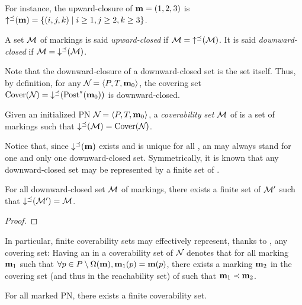 For instance, the upward-closure of $\mathbf{m} = (1, 2, 3)$ is $\operatorname{\uparrow^\preceq}(\mathbf{m}) = \left\{(i, j, k) \mid i \geq 1, j \geq 2, k \geq 3\right\}$.

\begin{defi}
  A set $\mathcal{M}$ of markings is said \emph{upward-closed} if $\mathcal{M} = \operatorname{\uparrow^\preceq}(\mathcal{M})$.
  It is said \emph{downward-closed} if $\mathcal{M} = \operatorname{\downarrow^\preceq}(\mathcal{M})$.
\end{defi}

Note that the downward-closure of a downward-closed set is the set itself.
Thus, by definition, for any $\defPN$, the covering set $\operatorname{Cover}(\mathcal{N}_{}) = \operatorname{\downarrow^\preceq}(\operatorname{Post}^*_{{}}(\mathbf{m}_0))$ is downward-closed.

\begin{defi}
  Given an initialized \ac{PN} $\defPN$, a \emph{coverability set} $\mathcal{M}$ of \namePN is a set of markings such that $\operatorname{\downarrow^\preceq}(\mathcal{M}) = \operatorname{Cover}(\mathcal{N}_{})$.
\end{defi}

Notice that, since $\operatorname{\downarrow^\preceq}(\mathbf{m})$ exists and is unique for all \omark \mar, an \omark may always stand for one and only one downward-closed set.
Symmetrically, it is known that any downward-closed set may be represented by a finite set of \omarks \cite{Abdulla96,Geeraerts06}.

\begin{lemm}
  \label{theo:repr-downc-sets}
  For all downward-closed set $\mathcal{M}$ of markings, there exists a finite set of \omarks $\mathcal{M}'$ such that $\operatorname{\downarrow^\preceq}(\mathcal{M}') = \mathcal{M}$.
\end{lemm}

\begin{proof}
\end{proof}

In particular, finite coverability sets may effectively represent, thanks to \omarks, any covering set:
Having an \omark \mar in a coverability set of $\mathcal{N}_{}$ denotes that for all marking $\mathbf{m}_1$ such that $\forall p \in P \setminus \operatorname{\Omega}(\mathbf{m}), \mathbf{m}_1(p) = \mathbf{m}(p)$, there exists a marking $\mathbf{m}_2$ in the covering set (and thus in the reachability set) of \namePN such that $\mathbf{m}_1 \prec \mathbf{m}_2$.

\begin{lemm}
  \label{theo:finite-coverability-set}
  For all marked PN, there exists a finite coverability set.
\end{lemm}

